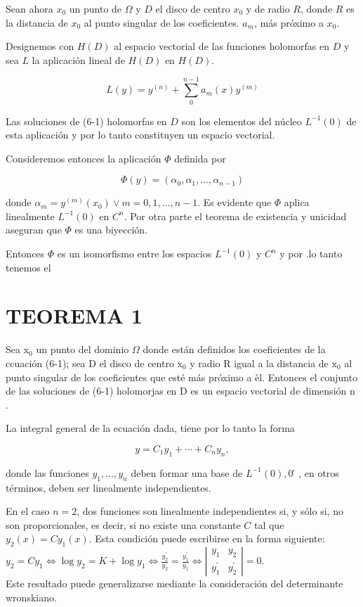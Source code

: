 \documentclass[10pt]{article}
\theoremstyle{plain}
\theoremstyle{definition}
\theoremstyle{remark}
\begin{document}
Sean ahora $x_{0}$ un punto de $\Omega$ y $D$ el disco de centro $x_{0}$ y de radio $R$, donde $R$ es la distancia de $x_{0}$ al punto singular de los coeficientes. $a_{m}$, más próximo a $x_{0}$.

Designemos con $H(D)$ al espacio vectorial de las funciones holomorfas en $D$ y sea $L$ la aplicación lineal de $H(D)$ en $H(D)$.


\begin{equation*}
L(y)=y^{(n)}+\sum_{0}^{n-1} a_{m}(x) y^{(m)} \tag{6-4}
\end{equation*}


Las soluciones de (6-1) holomorfas en $D$ son los elementos del núcleo $L^{-1}(0)$ de esta aplicación y por lo tanto constituyen un espacio vectorial.

Consideremos entonces la aplicación $\Phi$ definida por

$$
\Phi(y)=\left(\alpha_{0}, \alpha_{1}, \ldots, \alpha_{n-1}\right)
$$

donde $\alpha_{m}=y^{(m)}\left(x_{0}\right) \vee m=0,1, \ldots, n-1$. Es evidente que $\Phi$ aplica linealmente $L^{-1}(0)$ en $C^{n}$. Por otra parte el teorema de existencia y unicidad aseguran que $\Phi$ es una biyección.

Entonces $\Phi$ es un isomorfismo entre los espacios $L^{-1}(0)$ y $C^{n}$ y por .lo tanto tenemos el

\section*{TEOREMA 1}
Sea $\mathrm{x}_{0}$ un punto del dominio $\Omega$ donde están definidos los coeficientes de la ccuación (6-1); sea D el disco de centro $\mathrm{x}_{0}$ y radio R igual a la distancia de $\mathrm{x}_0$ al punto singular de los coeficientes que esté más próximo a èl. Entonces el conjunto de las soluciones de (6-1) holomorjas en D es un espacio vectorial de dimensión n .

La integral general de la ecuación dada, tiene por lo tanto la forma


\begin{equation*}
y=C_{1} y_{1}+\cdots+C_{n} y_{n}, \tag{6-5}
\end{equation*}


donde las funciones $y_{1}, \ldots, y_{n}$ deben formar una base de $L^{-1}(0), 0 ́$, en otros términos, deben ser linealmente independientes.

En el caso $n=2$, dos funciones son linealmente independientes si, y sólo si, no son proporcionales, es decir, si no existe una constante $C$ tal que $y_{2}(x)=C y_{1}(x)$. Esta condición puede escribirse en la forma siguiente:\\
$y_{2}=C y_{1} \Longleftrightarrow \log y_{2}=K+\log y_{1} \Longleftrightarrow \frac{y_{2}^{\prime}}{y_{2}}=\frac{y_{1}^{\prime}}{y_{1}} \Longleftrightarrow\left|\begin{array}{ll}y_{1} & y_{2} \\ y_{1}^{\prime} & y_{2}^{\prime}\end{array}\right|=0$.\\
Este resultado puede generalizarse mediante la consideración del determinante wronskiano.
\end{document}
